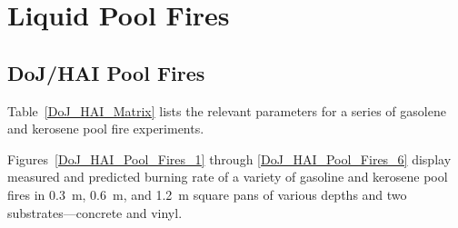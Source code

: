 \clearpage

\section{Liquid Pool Fires}
\label{sec:Liquid_Pool_Fires_MLR}

\subsection{DoJ/HAI Pool Fires}

Table~\ref{DoJ_HAI_Matrix} lists the relevant parameters for a series of gasolene and kerosene pool fire experiments.

Figures~\ref{DoJ_HAI_Pool_Fires_1} through \ref{DoJ_HAI_Pool_Fires_6} display measured and predicted burning rate of a variety of gasoline and kerosene pool fires in 0.3~m, 0.6~m, and 1.2~m square pans of various depths and two substrates---concrete and vinyl.

\newpage

